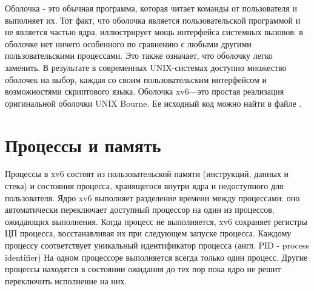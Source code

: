 Оболочка - это обычная программа,
которая читает команды от пользователя и выполняет их.
Тот факт, что оболочка является
пользовательской программой и не является частью ядра,
иллюстрирует мощь интерфейса системных вызовов:
в оболочке нет ничего особенного по сравнению
с любыми другими пользовательскими процессами.
Это также означает, что оболочку легко заменить.
В результате в современных UNIX-системах
доступно множество оболочек на выбор,
каждая со своим пользовательским интерфейсом
и возможностями скриптового языка.
Оболочка xv6---это простая реализация
оригинальной оболочки UNIX Bourne.
Ее исходный код можно найти в файле .

\section{Процессы и память}

Процессы в xv6 состоят из пользовательской памяти
(инструкций, данных и стека)
и состояния процесса, хранящегося внутри ядра
и недоступного для пользователя.
Ядро xv6 выполняет разделение времени между процессами:
оно автоматически переключает доступный процессор
на один из процессов, ожидающих выполнения.
Когда процесс не выполняется,
xv6 сохраняет регистры ЦП процесса,
восстанавливая их при следующем запуске процесса.
Каждому процессу соответствует уникальный идентификатор процесса
(англ. PID - process identifier)
На одном процессоре выполняется всегда только один процесс.
Другие процессы находятся в состоянии ожидания
до тех пор пока ядро не решит переключить исполнение на них.

